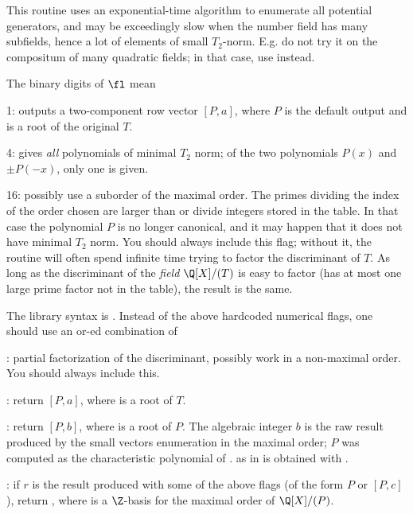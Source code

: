 This routine uses an exponential-time algorithm to
enumerate all potential generators, and may be exceedingly slow when the
number field has many subfields, hence a lot of elements of small $T_2$-norm.
E.g. do not try it on the compositum of many quadratic fields; in that case,
use  instead.

The binary digits of $\fl$ mean

1: outputs a two-component row vector $[P,a]$, where $P$ is the default
output and  is a root of the original $T$.

4: gives \emph{all} polynomials of minimal $T_2$ norm; of the two polynomials
$P(x)$ and $\pm P(-x)$, only one is given.

16: possibly use a suborder of the maximal order. The primes dividing the
index of the order chosen are larger than  or divide integers
stored in the  table. In that case the polynomial $P$ is
no longer canonical, and it may happen that it does not have minimal
$T_2$ norm. You should always include this flag; without it, the routine
will often spend infinite time trying to factor the discriminant of $T$. As
long as the discriminant of the \emph{field} $\Q[X]/(T)$ is easy to factor
(has at most one large prime factor not in the  table), the
result is the same.

The library syntax is .
Instead of the above hardcoded numerical flags, one should use an
or-ed combination of

\item {}: partial factorization of the discriminant,
possibly work in a non-maximal order. You should always include this.

\item {}: return $[P, a]$, where  is a root of $T$.

\item {}: return $[P, b]$, where  is a root of $P$.
The algebraic integer $b$ is the raw result produced by the small vectors
enumeration in the maximal order; $P$ was computed as the characteristic
polynomial of .  as in 
is obtained with .

\item {}: if $r$ is the result produced with some of the above
flags (of the form $P$ or $[P,c]$), return \kbd{[r,zk]}, where  is a
$\Z$-basis for the maximal order of $\Q[X]/(P)$.

